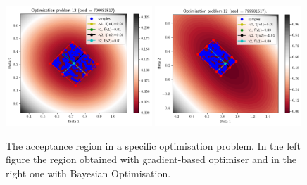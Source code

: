 
\begin{figure}[ht]
    \begin{center}
        \includegraphics[width=0.49\textwidth]{./latex_files/images/chapter4/ma2_region_3.png}
        \includegraphics[width=0.49\textwidth]{./latex_files/images/chapter4/ma2_region_3_bo.png}
    \end{center}
  \caption[The acceptance region of a specific deterministic simulator.]{The acceptance region in a specific optimisation problem. In the left figure the region obtained with gradient-based optimiser and in the right one with Bayesian Optimisation.}
  \label{fig:ma2_5}
\end{figure}


